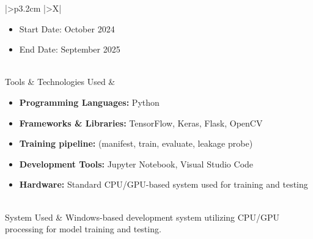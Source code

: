 \begin{table}[H]
\begin{tabularx}{\textwidth}{%
  |>{\bfseries\RaggedRight\arraybackslash}p{3.2cm}%
  |>{\color{black}\RaggedRight\arraybackslash}X|}
\begin{minipage}[t]{\linewidth}
\begin{itemize}[leftmargin=*, nosep, topsep=0pt]
    \item Start Date: October 2024
    \item End Date: September 2025
\end{itemize}
\vspace{0.02cm}
\end{minipage} \\
\hline
Tools \& Technologies Used &
\begin{minipage}[t]{\linewidth}
\vspace{0.02cm}
\begin{itemize}[leftmargin=*, nosep, topsep=0pt]
    \item \textbf{Programming Languages:} Python
    \item \textbf{Frameworks \& Libraries:} TensorFlow, Keras, Flask, OpenCV
    \item \textbf{Training pipeline:}  (manifest, train, evaluate, leakage probe)
    \item \textbf{Development Tools:} Jupyter Notebook, Visual Studio Code
    \item \textbf{Hardware:} Standard CPU/GPU-based system used for training and testing
\end{itemize}
\vspace{0.02cm}
\end{minipage} \\
\hline
System Used & Windows-based development system utilizing CPU/GPU processing for model training and testing. \\
\hline
\end{tabularx}
\end{table}

\tableofcontents
\clearpage
\listoffigures
\clearpage
\listoftables

